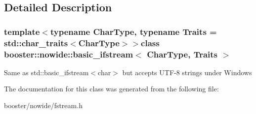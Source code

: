 \subsection{\-Detailed \-Description}
\subsubsection*{template$<$typename Char\-Type, typename Traits = std\-::char\-\_\-traits$<$\-Char\-Type$>$$>$class booster\-::nowide\-::basic\-\_\-ifstream$<$ Char\-Type, Traits $>$}

\-Same as std\-::basic\-\_\-ifstream$<$char$>$ but accepts \-U\-T\-F-\/8 strings under \-Windows 

\-The documentation for this class was generated from the following file\-:\begin{DoxyCompactItemize}
\item 
booster/nowide/fstream.\-h\end{DoxyCompactItemize}
